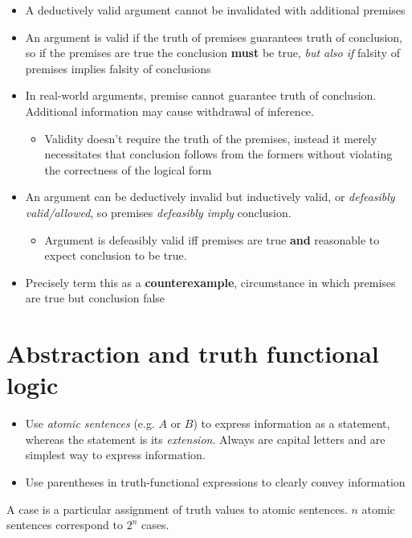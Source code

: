 \begin{itemize} 
    \item A deductively valid argument cannot be invalidated with additional premises
    \item An argument is valid if the truth of premises guarantees truth of conclusion, so if the premises are true the conclusion \textbf{must} be true, \textit{but also if} falsity of premises implies falsity of conclusions
    \item In real-world arguments, premise cannot guarantee truth of conclusion. Additional information may cause withdrawal of inference.
    \begin{itemize}
        \item Validity doesn't require the truth of the premises, instead it merely necessitates that conclusion follows from the formers without violating the correctness of the logical form
    \end{itemize}
    \item An argument can be deductively invalid but inductively valid, or \textit{defeasibly valid/allowed}, so premises \textit{defeasibly imply} conclusion.
    \begin{itemize}
        \item Argument is defeasibly valid iff premises are true \textbf{and} reasonable to expect conclusion to be true.
    \end{itemize}
    \item Precisely term this as a \textbf{counterexample}, circumstance in which premises are true but conclusion false
\end{itemize}

\section{Abstraction and truth functional logic}

\begin{itemize} 
    \item Use \textit{atomic sentences} (e.g. $A$ or $B$) to express information as a statement, whereas the statement is its \textit{extension}.
    Always are capital letters and are simplest way to express information.
    \item Use parentheses in truth-functional expressions to clearly convey information
\end{itemize}

\begin{definition}[Case]
    A case is a particular assignment of truth values to atomic sentences. $n$ atomic sentences correspond to $2^n$ cases.
\end{definition}

